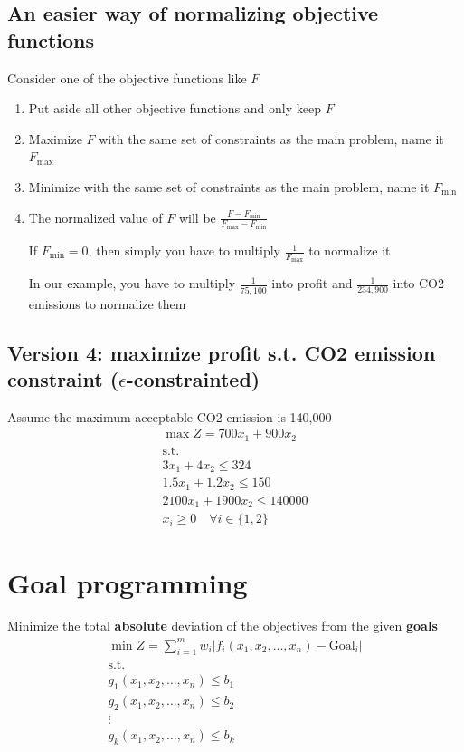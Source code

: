 \documentclass[10pt]{article}
\begin{document}
\subsection{An easier way of normalizing objective functions}
Consider one of the objective functions like $F $
\begin{enumerate}
    \item Put aside all other objective functions and only keep $F $
    \item Maximize $F $ with the same set of constraints as the main problem, name it $F_\text{max} $
    \item Minimize with the same set of constraints as the main problem, name it $F_\text{min} $
    \item The normalized value of $F $ will be $\frac{F - F_\text{min}}{F_\text{max} - F_\text{min}} $

    If $F_\text{min} = 0 $, then simply you have to multiply $\frac{1}{F_\text{max}} $ to normalize it 

    In our example, you have to multiply $\frac{1}{75,100} $ into profit and $\frac{1}{234,900} $ into CO2 emissions to normalize them 
\end{enumerate}
\subsection{Version 4: maximize profit s.t. CO2 emission constraint ($\epsilon $-constrainted)}
Assume the maximum acceptable CO2 emission is 140,000 
\begin{gather*}
    \max Z = 700x_1 + 900x_2 \\
    \text{s.t.}\\
    3x_1 + 4x_2 \le 324\\
    1.5x_1 + 1.2x_2 \le 150\\
    2100x_1 + 1900x_2 \le 140000\\
    x_i \ge 0 \quad\forall i \in \{1, 2\}
\end{gather*}
\newpage 
\section{Goal programming}
Minimize the total \textbf{absolute} deviation of the objectives from the given \textbf{goals}
\begin{gather*}
    \min Z = \sum_{i = 1}^{m}w_i|f_i(x_1, x_2,\dots, x_n) - \text{Goal}_i|\\
    \text{s.t.}\\
    g_1(x_1, x_2, \dots, x_n) \le b_1\\
    g_2(x_1, x_2, \dots, x_n) \le b_2\\
    \vdots \\
    g_k(x_1, x_2, \dots, x_n) \le b_k
\end{gather*}
\end{document}

